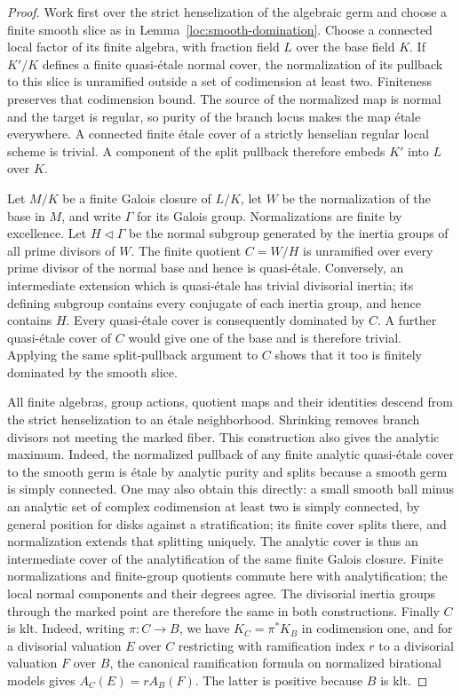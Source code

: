 \begin{proof}
Work first over the strict henselization of the algebraic germ and
choose a finite smooth slice as in
Lemma~\ref{loc:smooth-domination}.  Choose a connected local factor
of its finite algebra, with fraction field $L$ over the base field
$K$.  If $K'/K$ defines a finite quasi-\'etale normal cover, the
normalization of its pullback to this slice is unramified outside a
set of codimension at least two.  Finiteness preserves that
codimension bound.  The source of the normalized map is normal and
the target is regular, so purity of the branch locus
\cite[Tag 0BMB]{StacksProject} makes the map \'etale everywhere.
A connected finite \'etale cover of a strictly henselian regular
local scheme is trivial.  A component of the split pullback
therefore embeds $K'$ into $L$ over $K$.

Let $M/K$ be a finite Galois closure of $L/K$, let $W$ be the
normalization of the base in $M$, and write $\Gamma$ for its Galois
group.  Normalizations are finite by excellence.  Let $H\lhd\Gamma$
be the normal subgroup generated by the inertia groups of all prime
divisors of $W$.  The finite quotient $C=W/H$ is unramified over
every prime divisor of the normal base and hence is quasi-\'etale.
Conversely, an intermediate extension which is quasi-\'etale has
trivial divisorial inertia; its defining subgroup contains every
conjugate of each inertia group, and hence contains $H$.  Every
quasi-\'etale cover is consequently dominated by $C$.  A further
quasi-\'etale cover of $C$ would give one of the base and is therefore
trivial.  Applying the same split-pullback argument to $C$ shows
that it too is finitely dominated by the smooth slice.

All finite algebras, group actions, quotient maps and their
identities descend from the strict henselization to an \'etale
neighborhood.  Shrinking removes branch divisors not meeting the
marked fiber.  This construction also gives the analytic maximum.
Indeed, the normalized pullback of any finite analytic
quasi-\'etale cover to the smooth germ is \'etale by analytic purity
and splits because a smooth germ is simply connected.  One may
also obtain this directly: a small smooth ball minus an analytic
set of complex codimension at least two is simply connected, by
general position for disks against a stratification; its finite
cover splits there, and normalization extends that splitting
uniquely.  The analytic cover is thus
an intermediate cover of the analytification of the same finite
Galois closure.  Finite normalizations and finite-group quotients
commute here with analytification; the local normal components and
their degrees agree.  The divisorial inertia groups through the
marked point are therefore the same in both constructions.  Finally
$C$ is klt.  Indeed, writing $\pi:C\to B$, we have
$K_C=\pi^*K_B$ in codimension one, and for a
divisorial valuation $E$ over $C$ restricting with ramification index
$r$ to a divisorial valuation $F$ over $B$, the canonical ramification
formula on normalized birational models gives
$A_C(E)=rA_B(F)$.  The latter is positive because $B$ is klt.


\end{proof}
